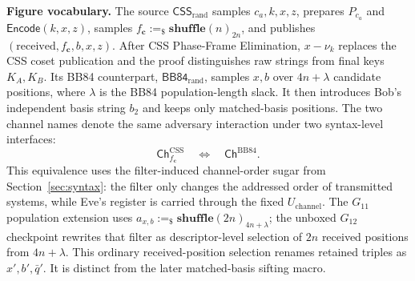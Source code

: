 \documentclass[conference,compsoc]{IEEEtran}
\newcommand{\bb}{\textsf{BB84}\xspace}
\begin{document}
\smallskip\noindent\textbf{Figure vocabulary.}
The source $\mathsf{CSS}_{\mathrm{rand}}$ samples \(c_a,k,x,z\), prepares \(P_{c_a}\) and \(\mathsf{Encode}(k,x,z)\), samples \(f_{\mathbf c}:=_\$\mathbf{shuffle}(n)_{2n}\), and publishes \((\mathrm{received},f_{\mathbf c},b,x,z)\). After CSS Phase-Frame Elimination, \(x-\nu_k\) replaces the CSS coset publication and the proof distinguishes raw strings from final keys \(K_A,K_B\). Its \bb counterpart, \(\mathsf{BB84}_{\mathrm{rand}}\), samples \(x,b\) over \(4n+\lambda\) candidate positions, where \(\lambda\) is the \bb population-length slack. It then introduces Bob's independent basis string \(b_2\) and keeps only matched-basis positions. The two channel names denote the same adversary interaction under two syntax-level interfaces:
\[
\mathsf{Ch}^{\mathrm{CSS}}_{f_{\mathbf c}}
\quad\Longleftrightarrow\quad
\mathsf{Ch}^{\mathrm{BB84}} .
\]
This equivalence uses the filter-induced channel-order sugar from Section~\ref{sec:syntax}: the filter only changes the addressed order of transmitted systems, while Eve's register is carried through the fixed \(U_{\mathrm{channel}}\). The \(G_{11}\) population extension uses \(a_{x,b}:=_\$\mathbf{shuffle}(2n)_{4n+\lambda}\); the unboxed \(G_{12}\) checkpoint rewrites that filter as descriptor-level selection of \(2n\) received positions from \(4n+\lambda\). This ordinary received-position selection renames retained triples as \(x',b',\bar q'\). It is distinct from the later matched-basis sifting macro.
\end{document}
